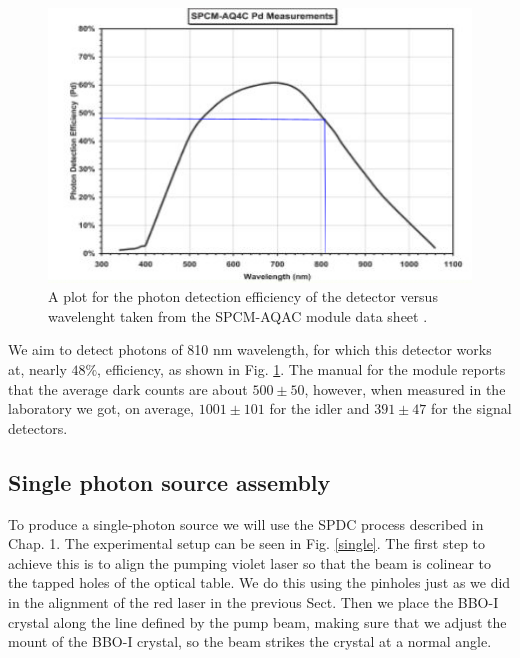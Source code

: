 \documentclass[12pt]{book}
\begin{document}
\begin{figure}[t!]
\centering
\includegraphics[scale=1]{images/effiency.png}
\caption{A plot for the photon detection efficiency of the detector versus wavelenght taken from the SPCM-AQAC module data sheet \cite{manual}.}
\label{module}
\end{figure}

We aim to detect photons of 810 nm wavelength, for which this detector works at, nearly $48\%$, efficiency, as shown in Fig. \ref{module}. The manual for the module \cite{manual} reports that the average dark counts are about $500\pm 50$, however, when measured in the laboratory we got, on average, $ 1001 \pm 101$ for the idler and $391 \pm 47$ for the signal detectors.

\subsection{Single photon source assembly}

To produce a single-photon source we will use the SPDC process described in Chap. 1. The experimental setup can be seen in Fig. \ref{single}. The first step to achieve this is to align the pumping violet laser so that the beam is colinear to the tapped holes of the optical table. We do this using the pinholes just as we did in the alignment of the red laser in the previous Sect. Then we place the BBO-I crystal along the line defined by the pump beam, making sure that we adjust the mount of the BBO-I crystal, so the beam strikes the crystal at a normal angle.
\end{document}
